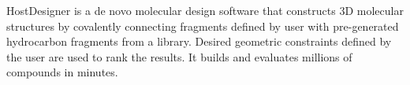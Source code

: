 HostDesigner is a de novo molecular design software that constructs 3D molecular structures by covalently connecting fragments defined by user with pre-generated hydrocarbon fragments from a library. Desired geometric constraints defined by the user are used to rank the results. It builds and evaluates millions of compounds in minutes.